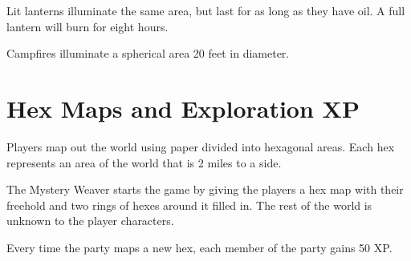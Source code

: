 \begin{multicols}{2}
Lit lanterns illuminate the same area, but last for as long as they have oil.
A full lantern will burn for eight hours.

Campfires illuminate a spherical area 20 feet in diameter.

\section{Hex Maps and Exploration XP}

Players map out the world using paper divided into hexagonal areas. Each hex
represents an area of the world that is 2 miles to a side.

The Mystery Weaver starts the game by giving the players a hex map with their freehold
and two rings of hexes around it filled in. The rest of the world is unknown to
the player characters.

Every time the party maps a new hex, each member of the party gains 50 XP.

\end{multicols}
